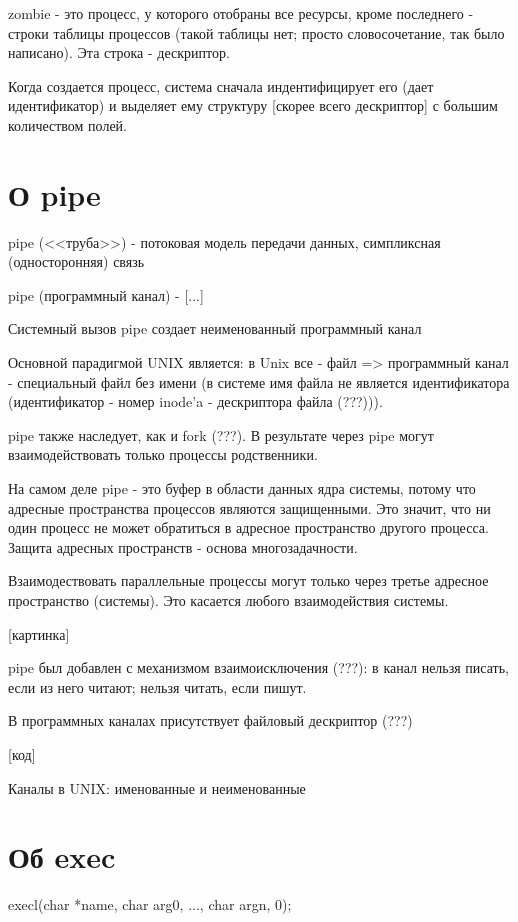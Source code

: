 \documentclass[14pt, a4paper]{article}
\begin{document}
	zombie - это процесс, у которого отобраны все ресурсы, кроме последнего - строки таблицы процессов (такой таблицы нет; просто словосочетание, так было написано). Эта строка - дескриптор.
	
	Когда создается процесс, система сначала индентифицирует его (дает идентификатор) и выделяет ему структуру [скорее всего дескриптор] с большим количеством полей.
	
	\section{О pipe}
	
	pipe (<<труба>>) - потоковая модель передачи данных, симпликсная (односторонняя) связь
	
	pipe (программный канал) - [...]
	
	Системный вызов pipe создает неименованный программный канал
	
	Основной парадигмой UNIX является: в Unix все - файл => программный канал - специальный файл без имени (в системе имя файла не является идентификатора (идентификатор - номер inode'a - дескриптора файла (???))).
	
	pipe также наследует, как и fork (???). В результате через pipe могут взаимодействовать только процессы родственники.
	
	На самом деле pipe - это буфер в области данных ядра системы, потому что адресные пространства процессов являются защищенными. Это значит, что ни один процесс не может обратиться в адресное пространство другого процесса. Защита адресных пространств - основа многозадачности.
	
	Взаимодествовать параллельные процессы могут только через третье адресное пространство (системы). Это касается любого взаимодействия системы.
	
	[картинка]
	
	pipe был добавлен с механизмом взаимоисключения (???): в канал нельзя писать, если из него читают; нельзя читать, если пишут.
	
	В программных каналах присутствует файловый дескриптор (???)
	
	[код]
	
	Каналы в UNIX: именованные и неименованные
	
	\section{Об exec}
	
	execl(char *name, char arg0, ..., char argn, 0);
	
\end{document}
